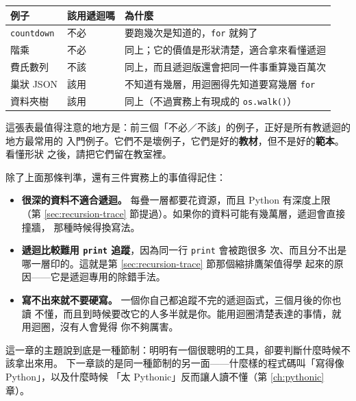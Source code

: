 \begin{center}
\begin{tabular}{@{}lll@{}}
\toprule
例子 & 該用遞迴嗎 & 為什麼 \\
\midrule
\texttt{countdown} & 不必 & 要跑幾次是知道的，\texttt{for} 就夠了 \\
階乘 & 不必 & 同上；它的價值是形狀清楚，適合拿來看懂遞迴 \\
費氏數列 & 不該 & 同上，而且遞迴版還會把同一件事重算幾百萬次 \\
巢狀 JSON & 該用 & 不知道有幾層，用迴圈得先知道要寫幾層 \texttt{for} \\
資料夾樹 & 該用 & 同上（不過實務上有現成的 \texttt{os.walk()}） \\
\bottomrule
\end{tabular}
\end{center}

這張表最值得注意的地方是：前三個「不必／不該」的例子，正好是所有教遞迴的地方最常用的
入門例子。它們不是壞例子，它們是好的\textbf{教材}，但不是好的\textbf{範本}。看懂形狀
之後，請把它們留在教室裡。

除了上面那條判準，還有三件實務上的事值得記住：

\begin{itemize}
\item \textbf{很深的資料不適合遞迴。} 每疊一層都要花資源，而且 Python 有深度上限
（第 \ref{sec:recursion-trace} 節提過）。如果你的資料可能有幾萬層，遞迴會直接撞牆，
那種時候得換寫法。
\item \textbf{遞迴比較難用 \texttt{print} 追蹤}，因為同一行 \texttt{print} 會被跑很多
次、而且分不出是哪一層印的。這就是第 \ref{sec:recursion-trace} 節那個縮排鷹架值得學
起來的原因——它是遞迴專用的除錯手法。
\item \textbf{寫不出來就不要硬寫。} 一個你自己都追蹤不完的遞迴函式，三個月後的你也讀
不懂，而且到時候要改它的人多半就是你。能用迴圈清楚表達的事情，就用迴圈，沒有人會覺得
你不夠厲害。
\end{itemize}


這一章的主題說到底是一種節制：明明有一個很聰明的工具，卻要判斷什麼時候不該拿出來用。
下一章談的是同一種節制的另一面——什麼樣的程式碼叫「寫得像 Python」，以及什麼時候
「太 Pythonic」反而讓人讀不懂（第 \ref{ch:pythonic} 章）。

